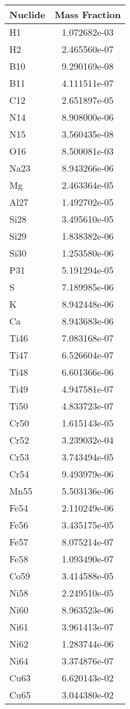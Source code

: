 \begin{centering}
\begin{table}[ht!]
\begin{tabular}{l | c}
\hline
Nuclide & Mass Fraction\\
\hline
H1 & 1.072682e-03\\
H2 & 2.465560e-07\\
B10 & 9.290169e-08\\
B11 & 4.111511e-07\\
C12 & 2.651897e-05\\
N14 & 8.908000e-06\\
N15 & 3.560435e-08\\
O16 & 8.500081e-03\\
Na23 & 8.943266e-06\\
Mg & 2.463364e-05\\
Al27 & 1.492702e-05\\
Si28 & 3.495610e-05\\
Si29 & 1.838382e-06\\
Si30 & 1.253580e-06\\
P31 & 5.191294e-05\\
S & 7.189985e-06\\
K & 8.942448e-06\\
Ca & 8.943683e-06\\
Ti46 & 7.083168e-07\\
Ti47 & 6.526604e-07\\
Ti48 & 6.601366e-06\\
Ti49 & 4.947581e-07\\
Ti50 & 4.833723e-07\\
Cr50 & 1.615143e-05\\
Cr52 & 3.239032e-04\\
Cr53 & 3.743494e-05\\
Cr54 & 9.493979e-06\\
Mn55 & 5.503136e-06\\
Fe54 & 2.110249e-06\\
Fe56 & 3.435175e-05\\
Fe57 & 8.075214e-07\\
Fe58 & 1.093490e-07\\
Co59 & 3.414588e-05\\
Ni58 & 2.249510e-05\\
Ni60 & 8.963523e-06\\
Ni61 & 3.961413e-07\\
Ni62 & 1.283744e-06\\
Ni64 & 3.374876e-07\\
Cu63 & 6.620143e-02\\
Cu65 & 3.044380e-02\\

\end{tabular}
\end{table}
\end{centering}
